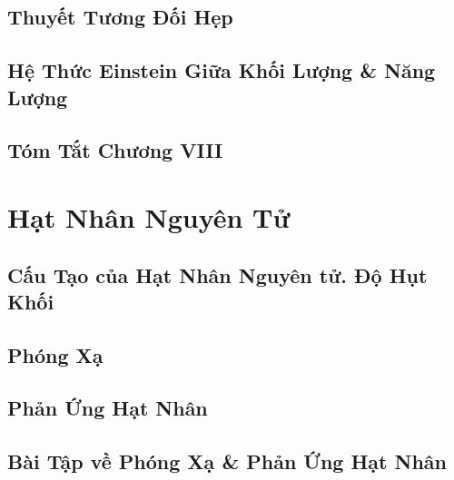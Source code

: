 \documentclass{article}
\numberwithin{equation}{section}
\begin{document}
\subsection{Thuyết Tương Đối Hẹp}


\subsection{Hệ Thức Einstein Giữa Khối Lượng \& Năng Lượng}


\subsection{Tóm Tắt Chương VIII}


\section{Hạt Nhân Nguyên Tử}

\subsection{Cấu Tạo của Hạt Nhân Nguyên tử. Độ Hụt Khối}


\subsection{Phóng Xạ}


\subsection{Phản Ứng Hạt Nhân}


\subsection{Bài Tập về Phóng Xạ \& Phản Ứng Hạt Nhân}
\end{document}
